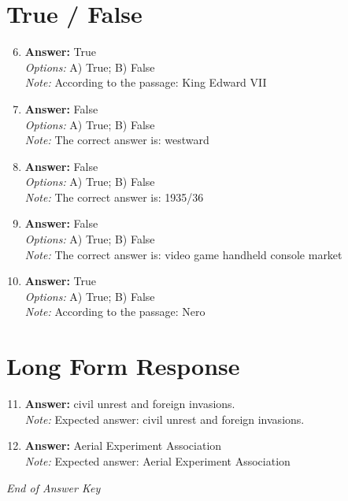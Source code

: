 \documentclass[12pt]{article}
\begin{document}
\section*{True / False}
\begin{enumerate}[label=\arabic*.]
\setcounter{enumi}{5}
\item \textbf{Answer:} True
\\ \textit{Options:} A) True; B) False
\\ \textit{Note:} According to the passage: King Edward VII
\item \textbf{Answer:} False
\\ \textit{Options:} A) True; B) False
\\ \textit{Note:} The correct answer is: westward
\item \textbf{Answer:} False
\\ \textit{Options:} A) True; B) False
\\ \textit{Note:} The correct answer is: 1935/36
\item \textbf{Answer:} False
\\ \textit{Options:} A) True; B) False
\\ \textit{Note:} The correct answer is: video game handheld console market
\item \textbf{Answer:} True
\\ \textit{Options:} A) True; B) False
\\ \textit{Note:} According to the passage: Nero
\end{enumerate}

\section*{Long Form Response}
\begin{enumerate}[label=\arabic*.]
\setcounter{enumi}{10}
\item \textbf{Answer:} civil unrest and foreign invasions.
\\ \textit{Note:} Expected answer: civil unrest and foreign invasions.
\item \textbf{Answer:} Aerial Experiment Association
\\ \textit{Note:} Expected answer: Aerial Experiment Association
\end{enumerate}

\vfill
\noindent\textit{End of Answer Key}
\end{document}
